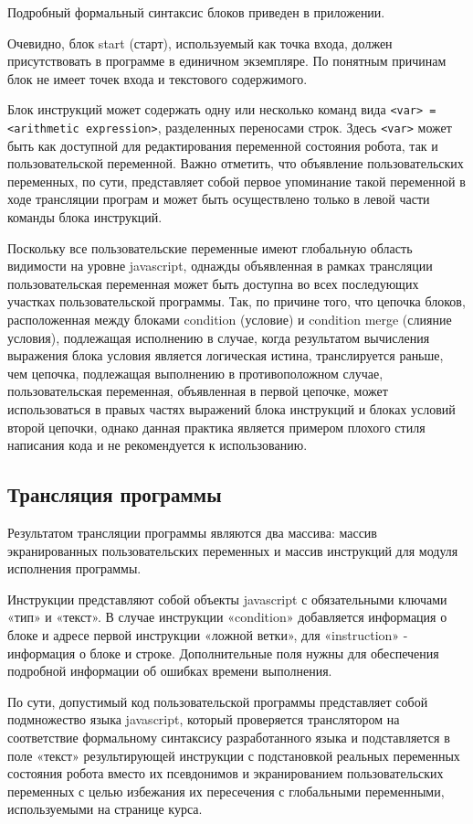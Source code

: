 Подробный формальный синтаксис блоков приведен в приложении.

Очевидно, блок start (старт), используемый как точка входа, должен присутствовать в программе в единичном экземпляре. По понятным причинам блок не имеет точек входа и текстового содержимого.

Блок инструкций может содержать одну или несколько команд вида \lstinline|<var> = <arithmetic expression>|, разделенных переносами строк. Здесь \lstinline|<var>| может быть как доступной для редактирования переменной состояния робота, так и пользовательской переменной. Важно отметить, что объявление пользовательских переменных, по сути, представляет собой первое упоминание такой переменной в ходе трансляции програм и может быть осуществлено только в левой части команды блока инструкций.

Поскольку все пользовательские переменные имеют глобальную область видимости на уровне javascript, однажды объявленная в рамках трансляции пользовательская переменная может быть доступна во всех последующих участках пользовательской программы. Так, по причине того, что цепочка блоков, расположенная между блоками condition (условие) и condition merge (слияние условия), подлежащая исполнению в случае, когда результатом вычисления выражения блока условия является логическая истина, транслируется раньше, чем цепочка, подлежащая выполнению в противоположном случае, пользовательская переменная, объявленная в первой цепочке, может использоваться в правых частях выражений блока инструкций и блоках условий второй цепочки, однако данная практика является примером плохого стиля написания кода и не рекомендуется к использованию.  

\subsection{Трансляция программы}

Результатом трансляции программы являются два массива: массив экранированных пользовательских переменных и массив инструкций для модуля исполнения программы.

Инструкции представляют собой объекты javascript с обязательными ключами «тип» и «текст». В случае инструкции «condition» добавляется информация о блоке и адресе первой инструкции «ложной ветки», для «instruction» - информация о блоке и строке. Дополнительные поля нужны для обеспечения подробной информации об ошибках времени выполнения.

По сути, допустимый код пользовательской программы представляет собой подмножество языка javascript, который проверяется транслятором на соответствие формальному синтаксису разработанного языка и подставляется в поле «текст» результирующей инструкции с подстановкой реальных переменных состояния робота вместо их псевдонимов и экранированием пользовательских переменных с целью избежания их пересечения с глобальными переменными, используемыми на странице курса.

